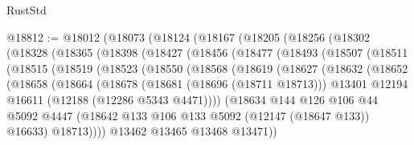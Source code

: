 \begin{lexlean}{RustStd}
\begin{coremodule}
@18812 := @18012
    (@18073
      (@18124
        (@18167
          (@18205
            (@18256
              (@18302
                (@18328
                  (@18365
                    (@18398
                      (@18427
                        (@18456
                          (@18477
                            (@18493
                              (@18507
                                (@18511
                                  (@18515
                                    (@18519
                                      (@18523
                                        (@18550
                                          (@18568
                                            (@18619
                                              (@18627
                                                (@18632
                                                  (@18652
                                                    (@18658
                                                      (@18664
                                                        (@18678
                                                          (@18681 (@18696 (@18711 @18713)))
                                                          @13401
                                                          @12194
                                                          @16611
                                                          (@12188 (@12286 @5343 @4471))))
                                                      (@18634
                                                        @144
                                                        @126
                                                        @106
                                                        @44
                                                        @5092
                                                        @4447
                                                        (@18642
                                                          @133
                                                          @106
                                                          @133
                                                          @5092
                                                          (@12147 (@18647 @133))
                                                          @16633)
                                                        @18713))))
                                                @13462
                                                @13465
                                                @13468
                                                @13471))

\end{coremodule}
\end{lexlean}
